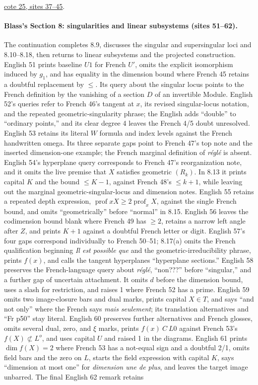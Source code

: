 \href{https://grothendieck.umontpellier.fr/web/viewer.html?file=../25.pdf\#page=38}{cote 25, sites 37--45}.

\paragraph{Blass's Section 8: singularities and linear subsystems (sites 51--62).}
The continuation completes 8.9, discusses the singular and supersingular loci and 8.10--8.18, then returns to linear subsystems and the projected construction. English 51 prints baseline $U1$ for French $U'$, omits the explicit isomorphism induced by $g_1$, and has equality in the dimension bound where French 45 retains a doubtful replacement by $\leq$. Its query about the singular locus points to the French definition by the vanishing of a section $D$ of an invertible Module. English 52's queries refer to French 46's tangent at $x$, its revised singular-locus notation, and the repeated geometric-singularity phrase; the English adds ``double'' to ``ordinary points,'' and its clear degree 4 leaves the French 4/5 doubt unresolved. English 53 retains its literal $W$ formula and index levels against the French handwritten omega. Its three separate gaps point to French 47's top note and the inserted dimension-one example; the French marginal definition of \emph{réglé} is absent. English 54's hyperplane query corresponds to French 47's reorganization note, and it omits the live premise that $X$ satisfies geometric $(R_k)$. In 8.13 it prints capital $K$ and the bound $\leq K-1$, against French 48's $\leq k+1$, while leaving out the marginal geometric-singular-locus and dimension notes. English 55 retains a repeated depth expression, $\operatorname{prof}xX\geq2\operatorname{prof}_xX$, against the single French bound, and omits ``geometrically'' before ``normal'' in 8.15. English 56 leaves the codimension bound blank where French 49 has $\geq2$, retains a narrow left angle after $Z$, and prints $K+1$ against a doubtful French letter or digit. English 57's four gaps correspond individually to French 50--51; 8.17(a) omits the French qualification beginning \emph{Il est possible que} and the geometric-irreducibility phrase, prints $f(x)$, and calls the tangent hyperplanes ``hyperplane sections.'' English 58 preserves the French-language query about \emph{réglé}, ``non???'' before ``singular,'' and a further gap of uncertain attachment. It omits $d$ before the dimension bound, uses a slash for restriction, and raises 1 where French 52 has a prime. English 59 omits two image-closure bars and dual marks, prints capital $X\in T$, and says ``and not only'' where the French says \emph{mais seulement}; its translation alternatives and ``Fr p50'' stay literal. English 60 preserves further alternatives and French glosses, omits several dual, zero, and $\xi$ marks, prints $f(x)\ C\ L0$ against French 53's $f(X)\not\subset L^o$, and uses capital $U$ and raised 1 in the diagrams. English 61 prints $\dim f(X)=2$ where French 53 has a not-equal sign and a doubtful 2/1, omits field bars and the zero on $L$, starts the field expression with capital $K$, says ``dimension at most one'' for \emph{dimension une de plus}, and leaves the target image unbarred. The final English 62 remark retains 
